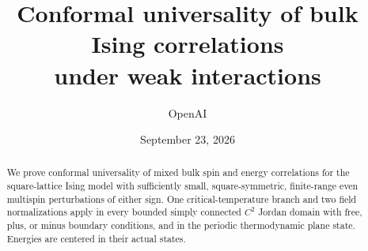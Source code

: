\documentclass[11pt]{article}
\title{Conformal universality of bulk Ising correlations\protect\\under weak interactions}
\author{OpenAI}
\date{September 23, 2026}
\numberwithin{equation}{section}
\theoremstyle{definition}
\begin{document}
\maketitle
\begin{abstract}
We prove conformal universality of mixed bulk spin and energy correlations
for the square-lattice Ising model with sufficiently small,
square-symmetric, finite-range even multispin perturbations of either sign.
One critical-temperature branch and two field normalizations apply in every
bounded simply connected $C^2$ Jordan domain with free, plus, or minus
boundary conditions, and in the periodic thermodynamic plane state.
Energies are centered in their actual states.
\end{abstract}
\tableofcontents
\newpage









\end{document}
